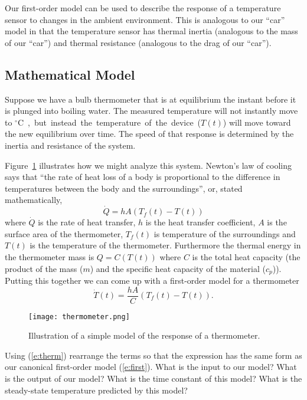 
Our first-order model can be used to describe the response of a temperature sensor to changes in the ambient environment.  This is analogous to our ``car'' model in that the temperature sensor has thermal inertia (analogous to the mass of our ``car'') and thermal resistance (analogous to the drag of our ``car'').  

\subsection{Mathematical Model}
Suppose we have a bulb thermometer that is at equilibrium the instant before it is plunged into boiling water.  The measured temperature will not instantly move to \unit[100]{$^{\circ}$C}, but instead the temperature of the device ($T(t)$) will move toward the new equilibrium over time.  The speed of that response is determined by the inertia and resistance of the system.

Figure~\ref{f:therm} illustrates how we might analyze this system.  Newton's law of cooling says that ``the rate of heat loss of a body is proportional to the difference in temperatures between the body and the surroundings'', or, stated mathematically,
\begin{equation}
\dot{Q}=hA (T_f(t)-T(t))
\end{equation}
where $\dot{Q}$ is the rate of heat transfer, $h$ is the heat transfer coefficient, $A$ is the surface area of the thermometer, $T_f(t)$ is temperature of the surroundings and $T(t)$ is the temperature of the thermometer.  Furthermore the thermal energy in the thermometer mass is $Q=C(T(t))$ where $C$ is the total heat capacity (the product of the mass ($m$) and the specific heat capacity of the material ($c_p$)).  Putting this together we can come up with a first-order model for a thermometer
\begin{equation}
\label{e:therm}
\dot{T}(t)= \frac{hA}{C}(T_f(t)-T(t)).
\end{equation}

\begin{figure}[hbt]
\centering
\texttt{[image: thermometer.png]}
\caption{Illustration of a simple model of the response of a thermometer.}
\label{f:therm}
\end{figure}

\begin{ex}
Using (\ref{e:therm}) rearrange the terms so that the expression has the same form as our canonical first-order model (\ref{e:first}).    What is the input to our model?  What is the output of our model?  What is the time constant of this model?  What is the steady-state temperature predicted by this model?
\end{ex}

